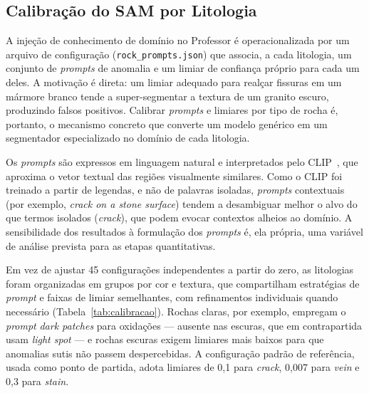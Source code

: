 \documentclass[12pt]{article}
\begin{document}
\subsection{Calibração do SAM por Litologia}

A injeção de conhecimento de domínio no Professor é operacionalizada por um arquivo de configuração (\texttt{rock\_prompts.json}) que associa, a cada litologia, um conjunto de \textit{prompts} de anomalia e um limiar de confiança próprio para cada um deles. A motivação é direta: um limiar adequado para realçar fissuras em um mármore branco tende a super-segmentar a textura de um granito escuro, produzindo falsos positivos. Calibrar \textit{prompts} e limiares por tipo de rocha é, portanto, o mecanismo concreto que converte um modelo genérico em um segmentador especializado no domínio de cada litologia.

Os \textit{prompts} são expressos em linguagem natural e interpretados pelo CLIP~\cite{clip_radford2021}, que aproxima o vetor textual das regiões visualmente similares. Como o CLIP foi treinado a partir de legendas, e não de palavras isoladas, \textit{prompts} contextuais (por exemplo, \textit{crack on a stone surface}) tendem a desambiguar melhor o alvo do que termos isolados (\textit{crack}), que podem evocar contextos alheios ao domínio. A sensibilidade dos resultados à formulação dos \textit{prompts} é, ela própria, uma variável de análise prevista para as etapas quantitativas.

Em vez de ajustar 45 configurações independentes a partir do zero, as litologias foram organizadas em grupos por cor e textura, que compartilham estratégias de \textit{prompt} e faixas de limiar semelhantes, com refinamentos individuais quando necessário (Tabela~\ref{tab:calibracao}). Rochas claras, por exemplo, empregam o \textit{prompt} \textit{dark patches} para oxidações --- ausente nas escuras, que em contrapartida usam \textit{light spot} --- e rochas escuras exigem limiares mais baixos para que anomalias sutis não passem despercebidas. A configuração padrão de referência, usada como ponto de partida, adota limiares de 0,1 para \textit{crack}, 0,007 para \textit{vein} e 0,3 para \textit{stain}.
\end{document}
